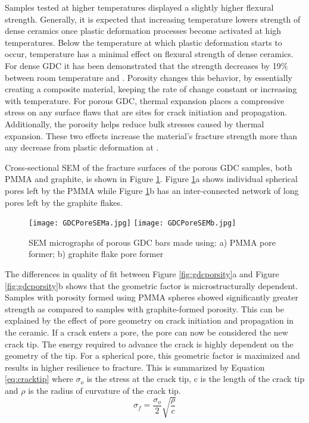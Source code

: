 Samples tested at higher temperatures displayed a slightly higher flexural strength.
Generally, it is expected that increasing temperature lowers strength of dense ceramics once plastic deformation processes become activated at high temperatures.\cite{Davidge1970}
Below the temperature at which plastic deformation starts to occur, temperature has a minimal effect on flexural strength of dense ceramics.
For dense GDC it has been demonstrated that the strength decreases by 19\% between room temperature and .\cite{Mogensen2000}
Porosity changes this behavior, by essentially creating a composite material, keeping the rate of change constant or increasing with temperature.\cite{Giraud2008}
For porous GDC, thermal expansion places a compressive stress on any surface flaws that are sites for crack initiation and propagation.
Additionally, the porosity helps reduce bulk stresses caused by thermal expansion.
These two effects increase the material's fracture strength more than any decrease from plastic deformation at .

Cross-sectional SEM of the fracture surfaces of the porous GDC samples,
both PMMA and graphite, is shown in Figure \ref{fig:GDCPoreSEM}.
Figure \ref{fig:GDCPoreSEM}a shows individual spherical pores left by the PMMA while Figure \ref{fig:GDCPoreSEM}b has an inter-connected network of long pores left by the graphite flakes.
\begin{figure}
    \texttt{[image: GDCPoreSEMa.jpg]}
    \texttt{[image: GDCPoreSEMb.jpg]}
    \caption{SEM micrographs of porous GDC bars made using: a) PMMA pore former; b) graphite flake pore former}
    \label{fig:GDCPoreSEM}
\end{figure}

The differences in quality of fit between Figure \ref{fig:gdcporsity}a and Figure \ref{fig:gdcporsity}b shows that the geometric factor is microstructurally dependent.
Samples with porosity formed using PMMA spheres showed significantly greater strength as compared to samples with graphite-formed porosity.
This can be explained by the effect of pore geometry on crack initiation and propagation in the ceramic.
If a crack enters a pore, the pore can now be considered the new crack tip.
The energy required to advance the crack is highly dependent on the geometry of the tip.
For a spherical pore, this geometric factor is maximized and results in higher resilience to fracture.
This is summarized by Equation \ref{eq:cracktip} where \(\sigma_{o}\) is the stress at the crack tip, c is the length of the crack tip and \(\rho\) is the radius of curvature of the crack tip.\cite{Carter2007}
\begin{equation}
    \sigma_{f} = \frac{\sigma_{o}}{2}\sqrt{\frac{\rho}{c}}
    \label{eq:cracktip}
\end{equation}

